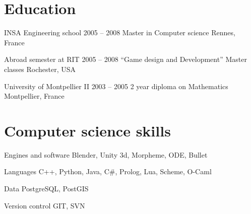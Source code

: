 \documentclass{tccv}
\begin{document}
\section{Education}

\begin{yearlist}

 \item[INSA Engineering school ]{2005 -- 2008}
     {Master in Computer science}
     {Rennes, France}
 
\item[Abroad semester at RIT]{2005 -- 2008}
     {``Game design and Development'' Master classes}
     {Rochester, USA}

\item[University of Montpellier II]{2003 -- 2005}
	 {2 year diploma on Mathematics}
     {Montpellier, France}
	 


\end{yearlist}

\section{Computer science skills}

\begin{factlist}

\item{Engines and software}
     {Blender, Unity 3d, Morpheme, ODE, Bullet}
	 
\item{Languages}
     {C++, Python, Java, C\#, Prolog, Lua, Scheme, O-Caml}
	 
\item{Data}
     {PostgreSQL, PostGIS}

\item{Version control}
     {GIT, SVN}

\end{factlist}



\end{document}

